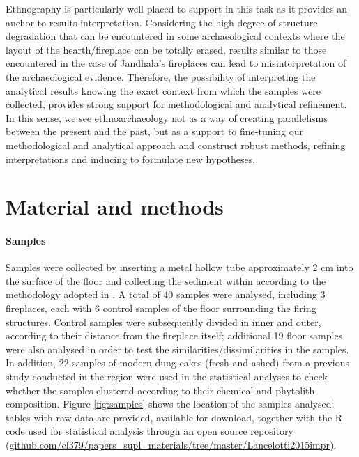 \documentclass[authoryear,preprint,review,12pt]{elsarticle}
\begin{document}
Ethnography is particularly well placed to support in this task as it provides an anchor to results interpretation. Considering the high degree of structure degradation that can be encountered in some archaeological contexts where the layout of the hearth/fireplace can be totally erased, results similar to those encountered in the case of Jandhala's fireplaces can lead to misinterpretation of the archaeological evidence. Therefore, the possibility of interpreting the analytical results knowing the exact context from which the samples were collected, provides strong support for methodological and analytical refinement. In this sense, we see ethnoarchaeology not as a way of creating parallelisms between the present and the past, but as a support to fine-tuning our methodological and analytical approach and construct robust methods, refining interpretations and inducing to formulate new hypotheses.

\section{Material and methods}
\label{sec:2}
\paragraph{Samples}
Samples were collected by inserting a metal hollow tube approximately 2 cm into the surface of the floor and collecting the sediment within according to the methodology adopted in \citet{Rondelli2014}. A total of 40 samples were analysed, including 3 fireplaces, each with 6 control samples of the floor surrounding the firing structures. Control samples were subsequently divided in inner and outer, according to their distance from the fireplace itself; additional 19 floor samples were also analysed in order to test the similarities/dissimilarities in the samples. In addition, 22 samples of modern dung cakes (fresh and ashed) from a previous study conducted in the region \citep{Lancelotti2012} were used in the statistical analyses to check whether the samples clustered according to their chemical and phytolith composition. Figure \ref{fig:samples} shows the location of the samples analysed; tables with raw data are provided, available for download, together with the R code used for statistical analysis through an open source repository (\url{github.com/cl379/papers_supl_materials/tree/master/Lancelotti2015impr}).
\end{document}
